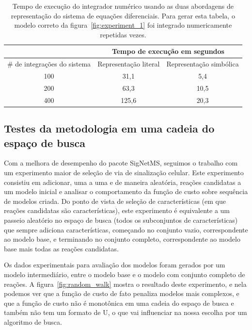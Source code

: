\documentclass[12pt]{article}
\begin{document}
\begin{table}[]
\centering
\begin{tabular}{ccc}
\hline
\multicolumn{1}{l}{}  & \multicolumn{2}{c}{Tempo de execução em segundos} \\ 
\hline

\multicolumn{1}{l}{\# de integrações do sistema}
    & Representação literal  & Representação simbólica  \\
\hline
100 & 31,1  & 5,4  \\
200 & 63,3  & 10,5 \\
400 & 125,6 & 20,3 \\ 
\hline
\end{tabular}
\caption{Tempo de execução do integrador numérico usando as duas
    abordagens de representação do sistema de equações diferenciais.
    Para gerar esta tabela, o modelo correto da
    figura~\ref{fig:experiment_1} foi integrado numericamente repetidas 
    vezes.}
\label{tab:integrador}
\end{table}

\subsection{Testes da metodologia em uma cadeia do espaço de busca} 
Com a melhora de desempenho do pacote SigNetMS, seguimos o trabalho com
um experimento maior de seleção de via de sinalização celular. Este
experimento consistiu em adicionar, uma a uma e de maneira aleatória, 
reações candidatas a um modelo inicial e analisar o comportamento da 
função de custo sobre sequência de modelos criada. Do ponto de vista de
seleção de características (em que reações candidatas são
características), este experimento é equivalente a um passeio aleatório
no espaço de busca (todos os subconjuntos de características) que sempre
adiciona características, começando no conjunto vazio, correspondente ao
modelo base, e terminando no conjunto completo, correspondente ao modelo
base mais todas as reações candidatas.

Os dados experimentais para avaliação dos modelos foram gerados por um
modelo intermediário, entre o modelo base e o modelo com conjunto
completo de reações. A figura~\ref{fig:random_walk} mostra o resultado 
deste experimento, e nela podemos ver que a função de custo de fato 
penaliza modelos mais complexos, e que a função de custo não é 
monotônica em uma cadeia do espaço de busca e também não tem um formato
de U, o que vai influenciar na nossa escolha por um algoritmo de busca.
\end{document}
